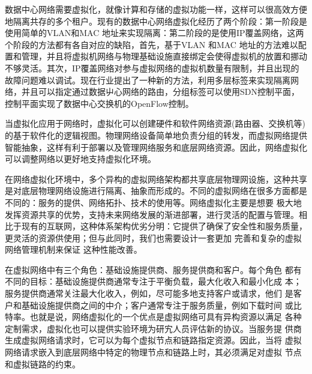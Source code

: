 数据中心网络需要虚拟化，就像计算和存储的虚拟功能一样，这样可以很高效方便地隔离共存的多个租户。现有的数据中心网络虚拟化经历了两个阶段：第一阶段是使用简单的VLAN和MAC 地址来实现隔离：第二阶段的是使用IP覆盖网络，这两个阶段的方法都有各自对应的缺陷，首先，基于VLAN 和MAC 地址的方法难以配置和管理，并且将虚拟机网络与物理基础设施直接绑定会使得虚拟机的放置和挪动不够灵活。其次，IP覆盖网络对参与虚拟网络的虚拟机数量有限制，并且出现的故障问题难以调试。现在行业提出了一种新的方法，利用多层标签来实现隔离网络，并且可以指定通过数据屮心网络的路由，分组标签可以使用SDN控制平面，控制平面实现了数据中心交换机的OpenFlow控制。


当虚拟化应用于网络时，虚拟化可以创建硬件和软件网络资源(路由器、交换机等)的基于软件化的逻辑视图。物理网络设备简单地负责分组的转发，而虚拟网络提供智能抽象，这样有利于部署以及管理网络服务和底层网络资源。因此，网络虚拟化可以调整网络以更好地支持虚拟化环境。


在网络虚拟化环境中，多个异构的虚拟网络架构都共享底层物理网设施，这种共享是对底层物理网络设施进行隔离、抽象而形成的。不同的虚拟网络在很多方面都是不同的：服务的提供、网络拓扑、技术的使用等。网络虚拟化主要是想要 极大地发挥资源共享的优势，支持未来网络发展的渐进部署，进行灵活的配置与管理。相比于现有的互联网，这种体系架构优劣分明：它提供了确保了安全性和服务质量，更灵活的资源供使用；但与此同时，我们也需要设计一套更加 完善和复杂的虚拟网络管理机制来保证 这种性能改善。

在虚拟网络中有三个角色：基础设施提供商、服务提供商和客户。每个角色 都有不同的目标：基础设施提供商通常专注于平衡负载，最大化收入和最小化成 本；服务提供商通常关注最大化收入，例如，尽可能多地支持客户或请求，他们 是客户和基础设施提供商之间的中介；客户通常专注于服务质量，例如下载时间 或比特率。也就是说，网络虚拟化的一个优点是虚拟网络可具有异构资源以满足 各种定制需求，虚拟化也可以提供实验环境为研宄人员评估新的协议。当服务提 供商生成虚拟网络请求时，它可以为每个虚拟节点和链路指定资源。因此，当将 虚拟网络请求嵌入到底层网络中特定的物理节点和链路上时，其必须满足对虚拟 节点和虚拟链路的约束。



